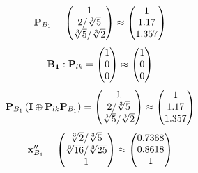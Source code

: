 \documentclass[10pt,a4paper]{article}
\begin{document}
	\[
		\bold{P}_{B_1} = 
		\begin{pmatrix}
			{1}{} \\
			{{2}} / {\sqrt[3]{5}} \\
			{\sqrt[3]{5}} / {\sqrt[3]{2}} \\
		\end{pmatrix}
		\approx
		\begin{pmatrix}
			1        \\
			1.17     \\
			1.357    \\
		\end{pmatrix}
	\]
	\[
		\bold{B_1}: \bold{P}_{lk} = 
		\begin{pmatrix}
			{1}{} \\
			{{0}}{} \\
			{{0}}{} \\
		\end{pmatrix}
		\approx
		\begin{pmatrix}
			1        \\
			0        \\
			0        \\
		\end{pmatrix}
	\]
	\[
		\bold{P}_{B_1}\left(\bold{I} \oplus \bold{P}_{lk}\bold{P}_{B_1}\right) = 
		\begin{pmatrix}
			{1}{} \\
			{{2}} / {\sqrt[3]{5}} \\
			{\sqrt[3]{5}} / {\sqrt[3]{2}} \\
		\end{pmatrix}
		\approx
		\begin{pmatrix}
			1        \\
			1.17     \\
			1.357    \\
		\end{pmatrix}
	\]
	\[
		\bold{x}''_{B_1} = 
		\begin{pmatrix}
			{\sqrt[3]{2}} / {\sqrt[3]{5}} \\
			{\sqrt[3]{16}} / {\sqrt[3]{25}} \\
			{1}{} \\
		\end{pmatrix}
		\approx
		\begin{pmatrix}
			0.7368   \\
			0.8618   \\
			1        \\
		\end{pmatrix}
	\]
\end{document}
